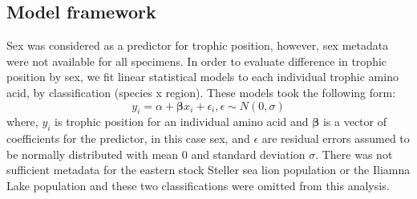\documentclass [11pt, proquest] {uwthesis}[2015/03/03]
\begin{document}
\subsection{Model framework}\label{model-framework}

Sex was considered as a predictor for trophic position, however, sex
metadata were not available for all specimens. In order to evaluate
difference in trophic position by sex, we fit linear statistical models
to each individual trophic amino acid, by classification (species x
region). These models took the following form:
\begin{equation} 
y_i = \alpha + \boldsymbol\beta x_i + \epsilon_i, \epsilon \sim N(0,\sigma)
  \label{eq:linsex}
\end{equation}
where, \(y_i\) is trophic position for an individual amino acid and
\(\boldsymbol\beta\) is a vector of coefficients for the predictor, in
this case sex, and \(\epsilon\) are residual errors assumed to be
normally distributed with mean 0 and standard deviation \(\sigma\).
There was not sufficient metadata for the eastern stock Steller sea lion
population or the Iliamna Lake population and these two classifications
were omitted from this analysis.
\end{document}
